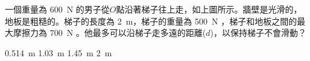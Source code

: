 

{
     \par\bigskip
    一個重量為 \qty{600}{N} 的男子從$O$點沿著梯子往上走，如上圖所示。牆壁是光滑的，地板是粗糙的。梯子的長度為 \qty{2}{m}，梯子的重量為 \qty{500}{N} ，梯子和地板之間的最大摩擦力為 \qty{700}{N} 。他最多可以沿梯子走多遠的距離($d$)，以保持梯子不會滑動？
    \begin{tasks}
        \task \qty{0.514}{m}
        \task \qty{1.03}{m}
        \task \qty{1.45}{m}
        \task \qty{2}{m}
    \end{tasks}

}{}

